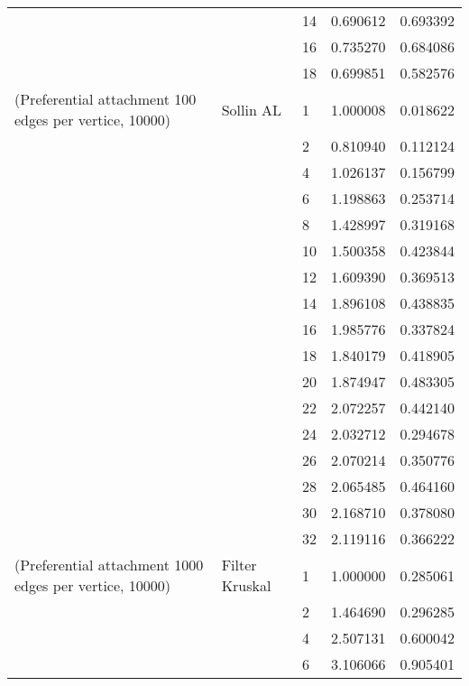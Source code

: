 \begin{tabular}{lllrr}
                      &            & 14 &  0.690612 &  0.693392 \\
                      &            & 16 &  0.735270 &  0.684086 \\
                      &            & 18 &  0.699851 &  0.582576 \\
(Preferential attachment 100 edges per vertice, 10000) & Sollin AL & 1  &  1.000008 &  0.018622 \\
                      &            & 2  &  0.810940 &  0.112124 \\
                      &            & 4  &  1.026137 &  0.156799 \\
                      &            & 6  &  1.198863 &  0.253714 \\
                      &            & 8  &  1.428997 &  0.319168 \\
                      &            & 10 &  1.500358 &  0.423844 \\
                      &            & 12 &  1.609390 &  0.369513 \\
                      &            & 14 &  1.896108 &  0.438835 \\
                      &            & 16 &  1.985776 &  0.337824 \\
                      &            & 18 &  1.840179 &  0.418905 \\
                      &            & 20 &  1.874947 &  0.483305 \\
                      &            & 22 &  2.072257 &  0.442140 \\
                      &            & 24 &  2.032712 &  0.294678 \\
                      &            & 26 &  2.070214 &  0.350776 \\
                      &            & 28 &  2.065485 &  0.464160 \\
                      &            & 30 &  2.168710 &  0.378080 \\
                      &            & 32 &  2.119116 &  0.366222 \\
(Preferential attachment 1000 edges per vertice, 10000) & Filter Kruskal & 1  &  1.000000 &  0.285061 \\
                      &            & 2  &  1.464690 &  0.296285 \\
                      &            & 4  &  2.507131 &  0.600042 \\
                      &            & 6  &  3.106066 &  0.905401 \\

\end{tabular}
